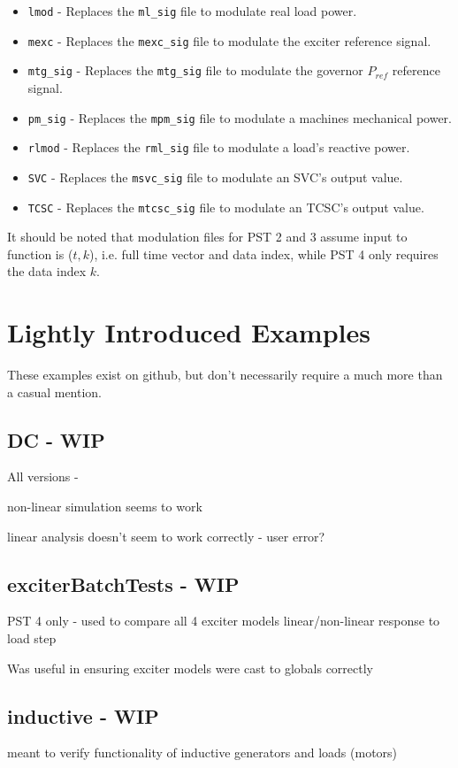 \begin{itemize}
\item \verb|lmod| - Replaces the \verb|ml_sig| file to modulate real load power.
\item \verb|mexc| - Replaces the \verb|mexc_sig| file to modulate the exciter reference signal.
\item \verb|mtg_sig| - Replaces the \verb|mtg_sig| file to modulate the governor $P_{ref}$ reference signal.
\item \verb|pm_sig| - Replaces the \verb|mpm_sig| file to modulate a machines mechanical power.
\item \verb|rlmod| - Replaces the \verb|rml_sig| file to modulate a load's reactive power.
\item \verb|SVC| - Replaces the \verb|msvc_sig| file to modulate an SVC's output value.
\item \verb|TCSC| - Replaces the \verb|mtcsc_sig| file to modulate an TCSC's output value.
\end{itemize}

\noindent It should be noted that modulation files for PST 2 and 3 assume input to function is ($t, k$), i.e. full time vector and data index, while PST 4 only requires the data index $k$.

\pagebreak
\section{Lightly Introduced Examples}
These examples exist on github, but don't necessarily require a much more than a casual mention.
\subsection{DC - WIP}
All versions - 

non-linear simulation seems to work

linear analysis doesn't seem to work correctly - user error?

\subsection{exciterBatchTests - WIP}
PST 4 only - used to compare all 4 exciter models linear/non-linear response to load step

Was useful in ensuring exciter models were cast to globals correctly

\subsection{inductive - WIP}
meant to verify functionality of inductive generators and loads (motors)

